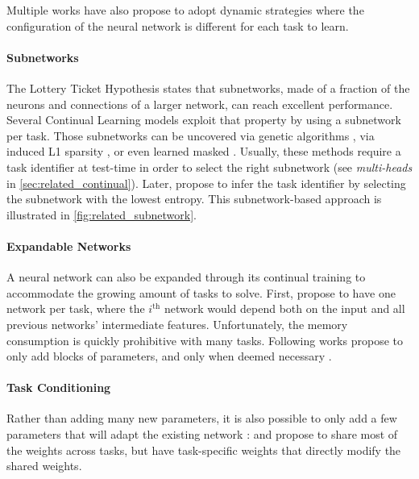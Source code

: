 Multiple works have also propose to adopt dynamic strategies where the configuration of the neural
network is different for each task to learn.

\paragraph{Subnetworks} The Lottery Ticket Hypothesis \citep{frankle2019lottery_ticket} states that
subnetworks, made of a fraction of the neurons and connections of a larger network, can reach
excellent performance. Several Continual Learning models exploit that property by using a
subnetwork per task. Those subnetworks can be uncovered via genetic algorithms
\citep{fernando2017path_net}, via induced L1 sparsity \citep{golkar2019neural_pruning}, or even
learned masked \cite{serra2018hat,hung2019cpg}. Usually, these methods require a task identifier at
test-time in order to select the right subnetwork (see \textit{multi-heads} in
\autoref{sec:related_continual}). Later, \cite{wortsman2020supermasks} propose to infer the task
identifier by selecting the subnetwork with the lowest entropy. This subnetwork-based approach is
illustrated in \autoref{fig:related_subnetwork}.

\paragraph{Expandable Networks} A neural network can also be expanded through its continual
training to accommodate the growing amount of tasks to solve. First, \cite{rusu2016progressive}
propose to have one network per task, where the $i^{\text{th}}$ network would depend both on the
input and all previous networks' intermediate features. Unfortunately, the memory consumption is
quickly prohibitive with many tasks. Following works propose to only add blocks of parameters,
and only when deemed necessary
\citep{hung2019cpg,veniat2021mntdp,ostapenko2021localmodulecomposition}.

\paragraph{Task Conditioning} Rather than adding many new parameters, it is also possible to only add
a few parameters that will adapt the existing network \citep{rebuffi2017visualadapters}:
\cite{wen2020batchensemble} and \cite{sun2019metatransfer} propose to share most of the weights
across tasks, but have task-specific weights that directly modify the shared weights.

